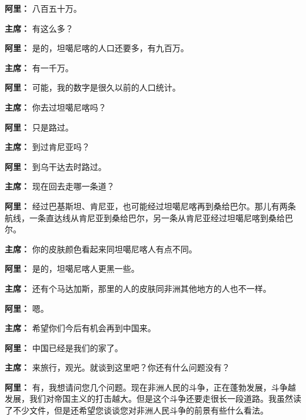 \begin{duihua}
\item[\textbf{阿里：}] 八百五十万。

\item[\textbf{主席：}] 有这么多？

\item[\textbf{阿里：}] 是的，坦噶尼喀的人口还要多，有九百万。

\item[\textbf{主席：}] 有一千万。

\item[\textbf{阿里：}] 可能，我的数字是很久以前的人口统计。

\item[\textbf{主席：}] 你去过坦噶尼喀吗？

\item[\textbf{阿里：}] 只是路过。

\item[\textbf{主席：}] 到过肯尼亚吗？

\item[\textbf{阿里：}] 到乌干达去时路过。

\item[\textbf{主席：}] 现在回去走哪一条道？

\item[\textbf{阿里：}] 经过巴基斯坦、肯尼亚，也可能经过坦噶尼喀再到桑给巴尔。那儿有两条航线，一条直达线从肯尼亚到桑给巴尔，另一条从肯尼亚经过坦噶尼喀到桑给巴尔。

\item[\textbf{主席：}] 你的皮肤颜色看起来同坦噶尼喀人有点不同。

\item[\textbf{阿里：}] 是的，坦噶尼喀人更黑一些。

\item[\textbf{主席：}] 还有个马达加斯，那里的人的皮肤同非洲其他地方的人也不一样。

\item[\textbf{阿里：}] 嗯。

\item[\textbf{主席：}] 希望你们今后有机会再到中国来。

\item[\textbf{阿里：}] 中国已经是我们的家了。

\item[\textbf{主席：}] 来旅行，观光。就谈到这里吧？你还有什么问题没有？

\item[\textbf{阿里：}] 有，我想请问您几个问题。现在非洲人民的斗争，正在蓬勃发展，斗争越发展，我们对帝国主义的打击越大。但是这个斗争还要走很长一段道路。我虽然读了不少文件，但是还希望您谈谈您对非洲人民斗争的前景有些什么看法。


\end{duihua}
